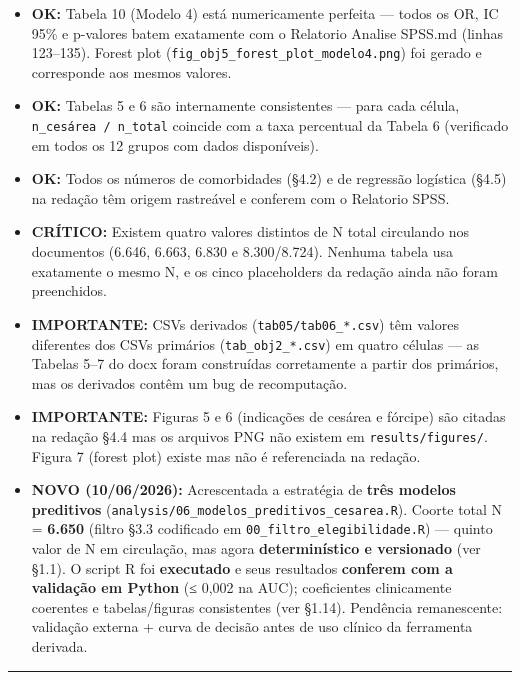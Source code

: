 \documentclass[
]{article}
\providecommand{\tightlist}{%
  \setlength{\itemsep}{0pt}\setlength{\parskip}{0pt}}
\begin{document}
\begin{itemize}
\tightlist
\item
  \textbf{OK:} Tabela 10 (Modelo 4) está numericamente perfeita ---
  todos os OR, IC 95\% e p-valores batem exatamente com o Relatorio
  Analise SPSS.md (linhas 123--135). Forest plot
  (\texttt{fig\_obj5\_forest\_plot\_modelo4.png}) foi gerado e
  corresponde aos mesmos valores.
\item
  \textbf{OK:} Tabelas 5 e 6 são internamente consistentes --- para cada
  célula, \texttt{n\_cesárea\ /\ n\_total} coincide com a taxa
  percentual da Tabela 6 (verificado em todos os 12 grupos com dados
  disponíveis).
\item
  \textbf{OK:} Todos os números de comorbidades (§4.2) e de regressão
  logística (§4.5) na redação têm origem rastreável e conferem com o
  Relatorio SPSS.
\item
  \textbf{CRÍTICO:} Existem quatro valores distintos de N total
  circulando nos documentos (6.646, 6.663, 6.830 e 8.300/8.724). Nenhuma
  tabela usa exatamente o mesmo N, e os cinco placeholders da redação
  ainda não foram preenchidos.
\item
  \textbf{IMPORTANTE:} CSVs derivados (\texttt{tab05/tab06\_*.csv}) têm
  valores diferentes dos CSVs primários (\texttt{tab\_obj2\_*.csv}) em
  quatro células --- as Tabelas 5--7 do docx foram construídas
  corretamente a partir dos primários, mas os derivados contêm um bug de
  recomputação.
\item
  \textbf{IMPORTANTE:} Figuras 5 e 6 (indicações de cesárea e fórcipe)
  são citadas na redação §4.4 mas os arquivos PNG não existem em
  \texttt{results/figures/}. Figura 7 (forest plot) existe mas não é
  referenciada na redação.
\item
  \textbf{NOVO (10/06/2026):} Acrescentada a estratégia de \textbf{três
  modelos preditivos}
  (\texttt{analysis/06\_modelos\_preditivos\_cesarea.R}). Coorte total N
  = \textbf{6.650} (filtro §3.3 codificado em
  \texttt{00\_filtro\_elegibilidade.R}) --- quinto valor de N em
  circulação, mas agora \textbf{determinístico e versionado} (ver §1.1).
  O script R foi \textbf{executado} e seus resultados \textbf{conferem
  com a validação em Python} (≤ 0,002 na AUC); coeficientes clinicamente
  coerentes e tabelas/figuras consistentes (ver §1.14). Pendência
  remanescente: validação externa + curva de decisão antes de uso
  clínico da ferramenta derivada.
\end{itemize}

\begin{center}\rule{0.5\linewidth}{0.5pt}\end{center}
\end{document}
